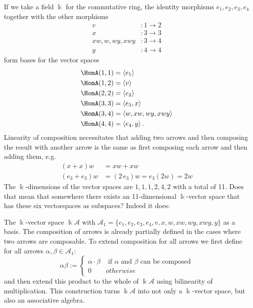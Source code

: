 \begin{example}
If we take a field $\Bbbk$ for the commutative ring, the identity morphisms $e_{1}, e_{2}, e_{3}, e_{4}$ together with the other morphisms
\begin{align*}
v &: 1 \rightarrow 2 \\
x &: 3 \rightarrow 3 \\
xw, w, wy, xwy &: 3 \rightarrow 4 \\
y &: 4 \rightarrow 4
\end{align*}
form bases for the vector spaces
\begin{align*}
\HomA(1,1) &= \left< e_{1} \right> \\
\HomA(1,2) &= \left< v \right> \\
\HomA(2,2) &= \left< e_{2} \right> \\
\HomA(3,3) &= \left< e_{3}, x \right> \\
\HomA(3,4) &= \left< w, xw, wy, xwy \right> \\
\HomA(4,4) &= \left< e_{4}, y \right>.
\end{align*}
Linearity of composition necessitates that adding two arrows and then composing the result with another arrow
is the same as first composing each arrow and then adding them, e.g.
\begin{align*}
(x+x)w &= xw + xw \\
(e_{3} + e_{3})w &= (2\,e_{3})w = e_{3}(2w) = 2w
\end{align*}
The $\Bbbk$-dimensions of the vector spaces are $1, 1, 1, 2, 4, 2$ with a total of 11. Does that mean that
somewhere there exists an 11-dimensional $\Bbbk$-vector space that has these six vectorspaces as subspaces? Indeed it does:

The $\Bbbk$-vector space $\Bbbk\mathcal{A}$ with $\mathcal{A}_{1} = \{ e_{1},e_{2},e_{3},e_{4}, v,x,w,xw, wy, xwy, y \}$ as a basis.
The composition of arrows is already partially defined in the cases where two arrows are composable. To extend composition for all
arrows we first define for all arrows $\alpha, \beta \in \mathcal{A}_{1}$:
\begin{equation}
\alpha\beta :=\label{eq:cat_alg_mult} \begin{cases}
\alpha\cdot\beta & \text{ if $\alpha$ and $\beta$ can be composed} \\
0 & otherwise
\end{cases}
\end{equation}
and then extend this product to the whole of $\Bbbk\mathcal{A}$ using bilinearity of multiplication.
This construction turns $\Bbbk\mathcal{A}$ into not only a $\Bbbk$-vector space, but also an associative algebra.
\end{example}

